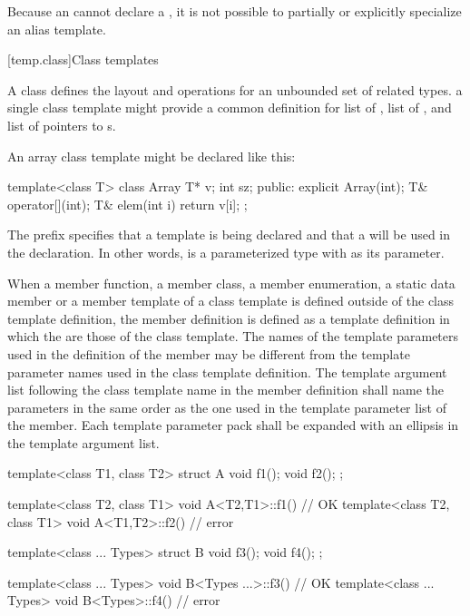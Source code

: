 \pnum
Because an  cannot declare a
, it is not possible to partially or
explicitly specialize an alias template.

[temp.class]{Class templates}

\pnum
A class
defines the layout and operations
for an unbounded set of related types.
\enterexample
a single class template
might provide a common definition for
list of
,
list of
,
and list of pointers to
s.
\exitexample

\enterexample
An array class template might be declared like this:

\begin{codeblock}
template<class T> class Array {
  T* v;
  int sz;
public:
  explicit Array(int);
  T& operator[](int);
  T& elem(int i) { return v[i]; }
};
\end{codeblock}

\pnum
The prefix
specifies that a template is being declared and that a
will be used in the declaration.
In other words,
is a parameterized type with
as its parameter.
\exitexample

\pnum
When a member function, a member class, a member enumeration, a static data member or
a member template of a class
template is defined outside of the class template definition,
the member definition is defined as a template definition in which the
are those of the class template.
The names of the template parameters used in the definition of the member may
be different from the template parameter names used in the class
template definition.
The template argument list following the class template name in the member
definition shall name the parameters in the same order as the one used in
the template parameter list of the member. Each template
parameter pack shall be expanded with an ellipsis in the template
argument list.
\enterexample

\begin{codeblock}
template<class T1, class T2> struct A {
  void f1();
  void f2();
};

template<class T2, class T1> void A<T2,T1>::f1() { }    // OK
template<class T2, class T1> void A<T1,T2>::f2() { }    // error
\end{codeblock}

\begin{codeblock}
template<class ... Types> struct B {
  void f3();
  void f4();
};

template<class ... Types> void B<Types ...>::f3() { }    // OK
template<class ... Types> void B<Types>::f4() { }        // error
\end{codeblock}

